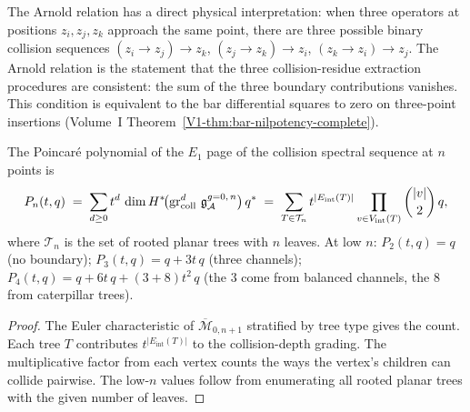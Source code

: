 \begin{remark}
The Arnold relation has a direct physical interpretation:
when three operators at positions $z_i, z_j, z_k$ approach
the same point, there are three possible binary collision
sequences $(z_i \to z_j) \to z_k$,
$(z_j \to z_k) \to z_i$,
$(z_k \to z_i) \to z_j$.
The Arnold relation is the statement that the three
collision-residue extraction procedures are consistent:
the sum of the three boundary contributions vanishes.
This condition is equivalent to the bar differential
squares to zero on three-point insertions
(Volume~I Theorem~\ref{V1-thm:bar-nilpotency-complete}).
\end{remark}

\begin{proposition}
The Poincar\'e polynomial of the $E_1$ page of the collision
spectral sequence at $n$ points is
\begin{equation}%
P_n(t,q)
\;=\;
\sum_{d \geq 0} t^d\,
\dim H^*\!\bigl(
 \grcoll^d\,\mathfrak{g}^{g{=}0,\,n}_\cA
\bigr)\,q^{*}
\;=\;
\sum_{T \in \mathcal{T}_n}
t^{|E_{\mathrm{int}}(T)|}
\prod_{v \in V_{\mathrm{int}}(T)}
\binom{|v|}{2}\,q,
\end{equation}
where $\mathcal{T}_n$ is the set of rooted planar trees with
$n$ leaves. At low $n$:
$P_2(t,q) = q$ \textup{(}no boundary\textup{)};
$P_3(t,q) = q + 3t\,q$ \textup{(}three channels\textup{)};
$P_4(t,q) = q + 6t\,q + (3 + 8)t^2\,q$
\textup{(}the $3$ come from balanced channels,
the $8$ from caterpillar trees\textup{)}.
\end{proposition}

\begin{proof}
The Euler characteristic of $\overline{\mathcal{M}}_{0,n+1}$
stratified by tree type gives the count. Each tree $T$ contributes
$t^{|E_{\mathrm{int}}(T)|}$ to the collision-depth grading. The
multiplicative factor from each vertex counts the ways the
vertex's children can collide pairwise. The low-$n$ values
follow from enumerating all rooted planar trees with the given
number of leaves.
\end{proof}


%
%

